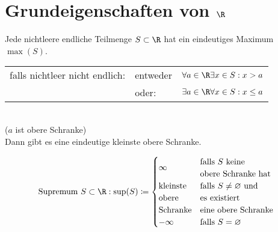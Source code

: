 \section{Grundeigenschaften von $\R$}
Jede nichtleere endliche Teilmenge $S \subset \R$ hat ein eindeutiges Maximum $\max(S)$.\\
\begin{tabular}{lll}
	falls nichtleer nicht endlich:	&entweder	&$\forall a \in \R \exists x \in S : x > a$ \\
						&oder:	&$\exists a \in \R \forall x \in S : x \leq a$
\end{tabular}\\
($a$ ist obere Schranke) \\
Dann gibt es eine eindeutige kleinste obere Schranke.\\
\begin{def*}[note = Supremum , index = Supremum]
	\[
		\text{Supremum } S \subset \R : \sup(S) \coloneqq  \begin{cases}
			\infty				&\begin{matrix*}[l]
									\text{falls $S$ keine}					\\
									\text{obere Schranke hat}
								\end{matrix*}							\\
			\begin{matrix*}[l]
				\text{kleinste}	\\
				\text{obere}	\\
				\text{Schranke}
			\end{matrix*}			&\begin{matrix*}[l]
									\text{falls $S \neq \varnothing$ und}		\\
									\text{es existiert}					\\
									\text{eine obere Schranke}
								\end{matrix*}							\\
			-\infty					&\text{falls $S = \varnothing$}			
		\end{cases}
	\]
\end{def*}

